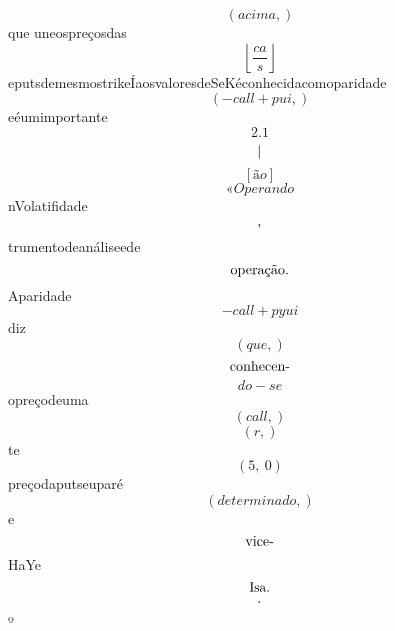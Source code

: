 \documentclass{article}
\begin{document}
\begin{equation}
\left( acima,\right)
\end{equation}que uneospreçosdas\begin{equation}
\left\lfloor{\frac{ca}{s}}\right\rfloor
\end{equation}eputsdemesmostrikeÍaosvaloresdeSeKéconhecidacomoparidade\begin{equation}
\left( - call + pui,\right)
\end{equation}eéumimportante\begin{equation}
2.1
\end{equation}\begin{equation}
$|$
\end{equation}\begin{equation}
\left[ ão\right]
\end{equation}\begin{equation}
«Operando
\end{equation}nVolatifidade\begin{equation}
$,$
\end{equation}trumentodeanáliseede\begin{equation}
$operação.$
\end{equation}Aparidade\begin{equation}
- call + pyui
\end{equation}diz\begin{equation}
\left( que,\right)
\end{equation}\begin{equation}
$conhecen-$
\end{equation}\begin{equation}
do - se
\end{equation}opreçodeuma\begin{equation}
\left( call,\right)
\end{equation}\begin{equation}
\left( r,\right)
\end{equation}te\begin{equation}
\left( 5, \  0\right)
\end{equation}preçodaputseuparé\begin{equation}
\left( determinado,\right)
\end{equation}e\begin{equation}
$vice-$
\end{equation}HaYe\begin{equation}
$Isa.$
\end{equation}\begin{equation}
$.$
\end{equation}º\begin{equation}

\end{equation}
\end{document}
